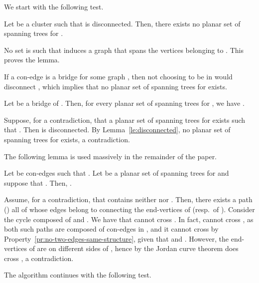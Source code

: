 \documentclass[letter,runningheads]{llncs}
\renewenvironment{proof}
{{\em Proof.\ }}{\hspace*{\fill}\par\vspace{2mm}}
\begin{document}
We start with the following test.

\begin{lemma}[{\sc Test 1}]\label{le:disconnected}
Let  be a cluster such that  is disconnected. Then, there exists no planar set  of spanning trees for .
\end{lemma}

\begin{proof}
No set  is such that  induces a graph that spans the vertices belonging to . This proves the lemma.
\end{proof}


If a con-edge  is a bridge for some graph , then not choosing  to be in  would disconnect , which implies that no planar set of spanning trees for  exists.

\begin{lemma}[{\sc Simplification 1}]\label{le:bridge}
Let  be a bridge of . Then, for every planar set  of spanning trees for , we have .
\end{lemma}

\begin{proof}
Suppose, for a contradiction, that a planar set  of spanning trees for  exists such that . Then  is disconnected. By Lemma~\ref{le:disconnected}, no planar set of spanning trees for  exists, a contradiction.
\end{proof}



The following lemma is used massively in the remainder of the paper.

\begin{lemma} \label{le:one-or-the-other}
Let  be con-edges such that . Let  be a planar set of spanning trees for  and suppose that . Then, .
\end{lemma}

\begin{proof}
Assume, for a contradiction, that  contains neither  nor . Then, there exists a path  () all of whose edges belong to  connecting the end-vertices of  (resp.\ of ). Consider the cycle  composed of  and . We have that  cannot cross  . In fact,  cannot cross , as both such paths are composed of con-edges in , and it cannot cross  by Property~\ref{pr:no-two-edges-same-structure}, given that  and . However, the end-vertices of  are on different sides of , hence by the Jordan curve theorem  does cross , a contradiction.
\end{proof}



The algorithm continues with the following test.
\end{document}
